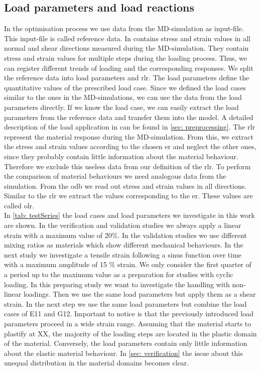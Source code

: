     \subsection{Load parameters and load reactions}\label{subsec:loadParameters}
    In the optimisation process we use data from the MD-simulation as input-file. This input-file is called reference data. In contains stress and strain values in all normal and shear directions measured during the MD-simulation. They contain stress and strain values for multiple steps during the loading process. Thus, we can register different trends of loading and the corresponding responses.
    We split the reference data into load parameters and \acrfull{rlr}. The load parameters define the quantitative values of the prescribed load case. 
    Since we defined the load cases similar to the ones in the MD-simulations, we can use the data from the load parameters directly.  If we know the load case, we can easily extract the load parameters from the reference data and transfer them into the  model. A detailed description of the load application in  can be found in \autoref{sec: preprocessing}. 
    The \acrshort{rlr} represent the material response during the MD-simulation. From this, we extract the stress and strain values according to the chosen \acrlong{er} and neglect the other ones, since they probably contain little information about the material behaviour. Therefore we exclude this useless data from our definition of the \acrshort{rlr}.
    To perform the comparison of material behaviours we need analogous data from the  simulation. From the odb we read out stress and strain values in all directions. Similar to the \acrshort{rlr} we extract the values corresponding to the \acrlong{er}. These values are called \acrfull{olr}. \\
    In \autoref{tab: testSeries} the load cases and load parameters we investigate in this work are shown.
    In the verification and validation studies we always apply a linear strain with a maximum value of 20\%. In the validation studies we use different mixing ratios as materials which show different mechanical behaviours. In the next study we investigate a tensile strain following a sinus function over time with a maximum amplitude of 15 \(\%\) strain. We only consider the first quarter of a period up to the maximum value as a preparation for studies with cyclic loading. In this preparing study we want to investigate the handling with non-linear loadings. Then we use the same load parameters but apply them as a shear strain. In the next step we use the same load parameters but combine the load cases of E11 and G12. Important to notice is that the previously introduced load parameters proceed in a wide strain range. Assuming that the material starts to plastify at XX, the majority of the loading steps are located in the plastic domain of the material. Conversely, the load parameters contain only little information about the elastic material behaviour. In \autoref{sec: verification} the issue about this unequal distribution in the material domains becomes clear.    
